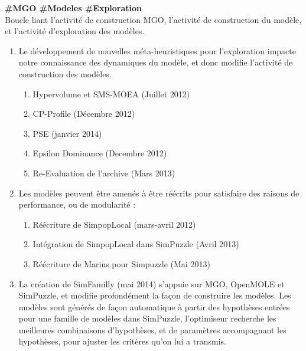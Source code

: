 \begin{myitemize2}
\item [4] \textbf{ \#MGO \#Modeles \#Exploration} \\ Boucle liant l'activité de construction MGO, l'activité de construction du modèle, et l'activité d'exploration des modèles.

\begin{enumerate}
\item  Le développement de nouvelles méta-heuristiques pour l'exploration impacte notre connaissance des dynamiques du modèle, et donc modifie l'activité de construction des modèles.
 \begin{enumerate}
	\item Hypervolume et SMS-MOEA (Juillet 2012)
	\item CP-Profile (Décembre 2012)
	\item PSE (janvier 2014)
	\item Epsilon Dominance (Decembre 2012)
	\item Re-Evaluation de l'archive (Mars 2013)
\end{enumerate}

\item Les modèles peuvent être amenés à être réécrits pour satisfaire des raisons de performance, ou de modularité :
\begin{enumerate}
	\item Réécriture de SimpopLocal (mars-avril 2012)
	\item Intégration de SimpopLocal dans SimPuzzle (Avril 2013)
	\item Réécriture de Marius pour Simpuzzle (Mai 2013)
\end{enumerate}

\item La création de SimFamilly (mai 2014) s'appuie sur MGO, OpenMOLE et SimPuzzle, et modifie profondément la façon de construire les modèles. Les modèles sont générés de façon automatique à partir des hypothèses entrées pour une famille de modèles dans SimPuzzle, l'optimiseur recherche les meilleures combinaisons d'hypothèses, et de paramètres accompagnant les hypothèses, pour ajuster les critères qu'on lui a transmis.


\end{enumerate}
\end{myitemize2}
